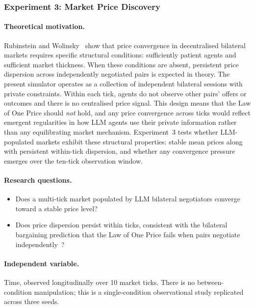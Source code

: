 \subsubsection{Experiment 3: Market Price Discovery}
\label{sec:exp-market}

\paragraph{Theoretical motivation.}
Rubinstein and Wolinsky~\cite{rubinstein1985} show that price convergence in decentralised bilateral markets requires specific structural conditions: sufficiently patient agents and sufficient market thickness. When these conditions are absent, persistent price dispersion across independently negotiated pairs is expected in theory.  The present simulator operates as a collection of independent bilateral sessions with private constraints. Within each tick, agents do not observe other pairs' offers or outcomes and there is no centralised price signal.  This design means that the Law of One Price should \emph{not} hold, and any price convergence across ticks would reflect emergent regularities in how LLM agents use their private information rather than any equilibrating market mechanism.  Experiment~3 tests whether LLM-populated markets exhibit these structural properties: stable mean prices along with persistent within-tick dispersion, and whether any convergence pressure emerges over the ten-tick observation window.

\paragraph{Research questions.}
\begin{itemize}
    \item[\textbf{RQ-31.}] Does a multi-tick market populated by LLM bilateral negotiators converge toward a stable price level?
    \item[\textbf{RQ-32.}] Does price dispersion persist within ticks, consistent with the bilateral bargaining prediction that the Law of One Price fails when pairs negotiate independently~\cite{rubinstein1985}?
\end{itemize}

\paragraph{Independent variable.}
Time, observed longitudinally over 10 market ticks.  There is no between-condition manipulation; this is a single-condition observational study replicated across three seeds.

